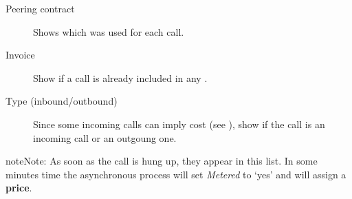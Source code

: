 \documentclass[letterpaper,10pt,english]{sphinxmanual}
\begin{document}
\begin{description}
\item[{Peering contract}] \leavevmode{}\label{billing_and_invoices/billable_calls:term-peering-contract}
Shows which {\hyperref[external_incoming_calls/peering_contracts:peering\string-contracts]{}} was used for
each call.

\item[{Invoice}] \leavevmode{}\label{billing_and_invoices/billable_calls:term-invoice}
Show if a call is already included in any {\hyperref[billing_and_invoices/invoices:invoices]{}}.

\item[{Type (inbound/outbound)}] \leavevmode{}\label{billing_and_invoices/billable_calls:term-type-inbound-outbound}
Since some incoming calls can imply cost (see
{\hyperref[external_incoming_calls/configure_ddi:bill\string-inbound]{}}), show if the call is an
incoming call or an outgoung one.

\end{description}

\begin{notice}{note}{Note:}
As soon as the call is hung up, they appear in this list. In some minutes
time the asynchronous process will set \emph{Metered} to `yes' and will assign a
\textbf{price}.
\end{notice}
\end{document}
